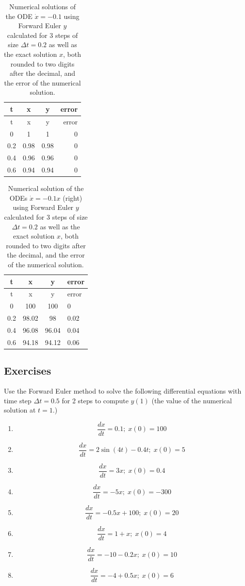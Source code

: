 \documentclass[
  letterpaper,
  DIV=11,
  numbers=noendperiod]{scrreprt}
\begin{document}
\begin{longtable}[]{@{}cccr@{}}
\caption{Numerical solutions of the ODE \(\dot x = -0.1\) using Forward
Euler \(y\) calculated for 3 steps of size \(\Delta t = 0.2\) as well as
the exact solution \(x\), both rounded to two digits after the decimal,
and the error of the numerical solution.}\tabularnewline
\toprule()
t & x & y & error \\
\midrule()
\endfirsthead
\toprule()
t & x & y & error \\
\midrule()
\endhead
0 & 1 & 1 & 0 \\
0.2 & 0.98 & 0.98 & 0 \\
0.4 & 0.96 & 0.96 & 0 \\
0.6 & 0.94 & 0.94 & 0 \\
\bottomrule()
\end{longtable}

\begin{longtable}[]{@{}cccl@{}}
\caption{Numerical solution of the ODEs \(\dot x = -0.1x\) (right) using
Forward Euler \(y\) calculated for 3 steps of size \(\Delta t = 0.2\) as
well as the exact solution \(x\), both rounded to two digits after the
decimal, and the error of the numerical solution.}\tabularnewline
\toprule()
t & x & y & error \\
\midrule()
\endfirsthead
\toprule()
t & x & y & error \\
\midrule()
\endhead
0 & 100 & 100 & 0 \\
0.2 & 98.02 & 98 & 0.02 \\
0.4 & 96.08 & 96.04 & 0.04 \\
0.6 & 94.18 & 94.12 & 0.06 \\
\bottomrule()
\end{longtable}

\label{tab:ch15_FE}

\hypertarget{exercises-17}{%
\subsection{Exercises}\label{exercises-17}}

Use the Forward Euler method to solve the following differential
equations with time step \(\Delta t=0.5\) for 2 steps to compute
\(y(1)\) (the value of the numerical solution at \(t=1\).)

\begin{enumerate}
\def\labelenumi{\arabic{enumi}.}
\item
  \[ \frac{dx}{dt} = 0.1; \; x(0)= 100 \]
\item
  \[ \frac{dx}{dt} =  2\sin(4t) -0.4t; \; x(0)= 5 \]
\item
  \[ \frac{dx}{dt} = 3x; \; x(0) = 0.4 \]
\item
  \[ \frac{dx}{dt} = -5x; \;  x(0) = -300 \]
\item
  \[ \frac{dx}{dt} = -0.5x + 100 ; \; x(0) = 20 \]
\item
  \[ \frac{dx}{dt} =  1 + x; \; x(0) = 4 \]
\item
  \[ \frac{dx}{dt} =  -10 - 0.2x; \; x(0) = 10 \]
\item
  \[ \frac{dx}{dt} =  -4 + 0.5x; \; x(0) = 6 \]
\end{enumerate}
\end{document}

